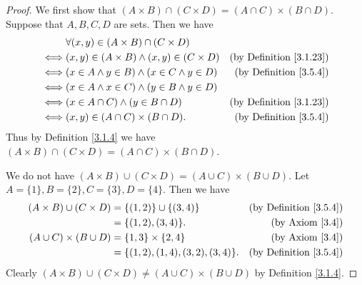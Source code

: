 \begin{proof}
    We first show that \((A \times B) \cap (C \times D) = (A \cap C) \times (B \cap D)\).
    Suppose that \(A, B, C, D\) are sets.
    Then we have
    \begin{align*}
             & \forall (x, y) \in (A \times B) \cap (C \times D)                                           \\
        \iff & (x, y) \in (A \times B) \land (x, y) \in (C \times D) & \text{(by Definition \ref{3.1.23})} \\
        \iff & (x \in A \land y \in B) \land (x \in C \land y \in D) & \text{(by Definition \ref{3.5.4})}  \\
        \iff & (x \in A \land x \in C) \land (y \in B \land y \in D)                                       \\
        \iff & (x \in A \cap C) \land (y \in B \cap D)               & \text{(by Definition \ref{3.1.23})} \\
        \iff & (x, y) \in (A \cap C) \times (B \cap D).              & \text{(by Definition \ref{3.5.4})}
    \end{align*}
    Thus by Definition \ref{3.1.4} we have \((A \times B) \cap (C \times D) = (A \cap C) \times (B \cap D)\).

    We do not have \((A \times B) \cup (C \times D) = (A \cup C) \times (B \cup D)\).
    Let \(A = \{1\}, B = \{2\}, C = \{3\}, D = \{4\}\).
    Then we have
    \begin{align*}
        (A \times B) \cup (C \times D) & = \{(1, 2)\} \cup \{(3, 4)\}          & \text{(by Definition \ref{3.5.4})} \\
                                       & = \{(1, 2), (3, 4)\}.                 & \text{(by Axiom \ref{3.4})}        \\
        (A \cup C) \times (B \cup D)   & = \{1, 3\} \times \{2, 4\}            & \text{(by Axiom \ref{3.4})}        \\
                                       & = \{(1, 2), (1, 4), (3, 2), (3, 4)\}. & \text{(by Definition \ref{3.5.4})}
    \end{align*}
    Clearly \((A \times B) \cup (C \times D) \neq (A \cup C) \times (B \cup D)\) by Definition \ref{3.1.4}.


\end{proof}
